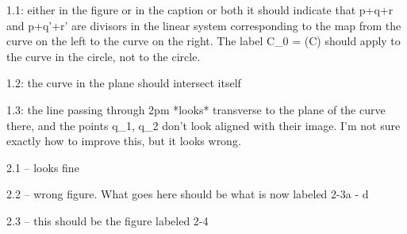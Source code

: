 1.1: either in the figure or in the caption or both it should indicate that p+q+r and p+q'+r' are divisors in the linear system
corresponding to the map from the curve on the left to the curve on the right. The label C_0 = \phi(C) should apply to the curve in the circle, not
to the circle.

1.2: the curve in the plane should intersect itself

1.3: the line passing through 2pm *looks* transverse to the plane of the curve there, and the points q_1, q_2 don't look aligned with their image. I'm not sure exactly how to improve this, but it looks wrong.

2.1 -- looks fine

2.2 -- wrong figure. What goes here should be what is now labeled 2-3a - d

2.3 -- this should be the figure labeled 2-4

